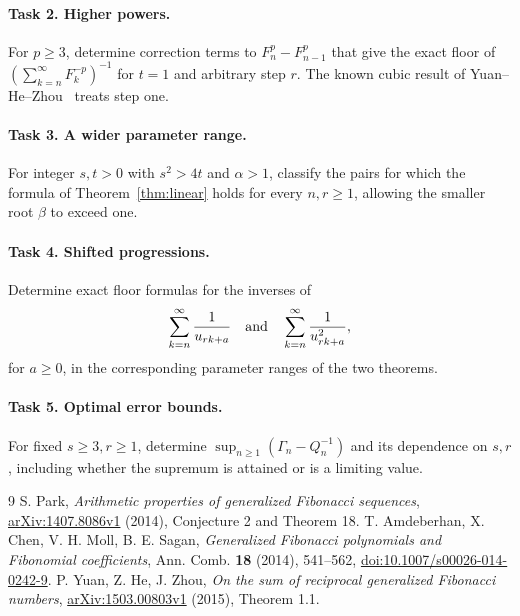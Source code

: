 \documentclass[11pt]{article}
\begin{document}
\paragraph{Task 2. Higher powers.}
For $p\geq3$, determine correction terms to
$F_n^p-F_{n-1}^p$ that give the exact floor of
$(\sum_{k=n}^{\infty}F_k^{-p})^{-1}$ for $t=1$ and arbitrary step $r$.
The known cubic result of Yuan--He--Zhou~\cite{YHZ} treats step one.

\paragraph{Task 3. A wider parameter range.}
For integer $s,t>0$ with $s^2>4t$ and $\alpha>1$, classify the pairs
for which the formula of Theorem~\ref{thm:linear} holds for every
$n,r\geq1$, allowing the smaller root $\beta$ to exceed one.

\paragraph{Task 4. Shifted progressions.}
Determine exact floor formulas for the inverses of
\[
\sum_{k=n}^{\infty}\frac1{u_{rk+a}}
\quad\hbox{and}\quad
\sum_{k=n}^{\infty}\frac1{u_{rk+a}^2},
\]
for $a\geq0$, in the corresponding
parameter ranges of the two theorems.

\paragraph{Task 5. Optimal error bounds.}
For fixed $s\geq3,r\geq1$, determine
$\sup_{n\geq1}(\Gamma_n-Q_n^{-1})$ and its dependence on $s,r$,
including whether the supremum is attained or is a limiting value.

\begin{thebibliography}{9}
S. Park, \emph{Arithmetic properties of generalized Fibonacci sequences},
\href{https://arxiv.org/abs/1407.8086}{arXiv:1407.8086v1} (2014),
Conjecture 2 and Theorem 18.
T. Amdeberhan, X. Chen, V. H. Moll, B. E. Sagan,
\emph{Generalized Fibonacci polynomials and Fibonomial coefficients},
Ann. Comb. \textbf{18} (2014), 541--562,
\href{https://doi.org/10.1007/s00026-014-0242-9}{doi:10.1007/s00026-014-0242-9}.
P. Yuan, Z. He, J. Zhou, \emph{On the sum of reciprocal generalized
Fibonacci numbers}, \href{https://arxiv.org/abs/1503.00803}{arXiv:1503.00803v1}
(2015), Theorem 1.1.
\end{thebibliography}
\end{document}
